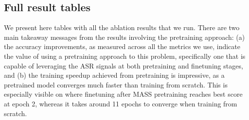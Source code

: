 \documentclass[11pt,a4paper]{article}
\begin{document}
\subsection{Full result tables}
\label{sec:fullresults}
We present here tables with all the ablation results that we run.
There are two main takeaway messages from the results involving the pretraining approach:
(a) the accuracy improvements, as measured across all the metrics we use, indicate the value of using a pretraining approach to this problem, specifically one that is capable of leveraging the ASR signals at both pretraining and finetuning stages, and
(b) the training speedup achieved from pretraining is impressive, as a pretrained model converges much faster than training from scratch. This is especially visible on \ldvmmerged where finetuning after MASS pretraining reaches best \rouge score at epoch 2, whereas it takes around 11 epochs to converge when training from scratch.
\end{document}
